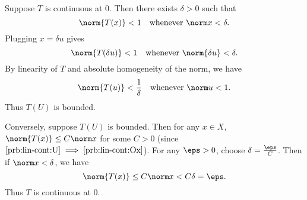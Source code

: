 \documentclass[12pt]{article}
\begin{document}
\begin{solution}
    Suppose $T$ is continuous at $0$.
    Then there exists $\delta > 0$ such that \[
        \norm{T(x)} < 1
            \quad\text{whenever } \norm x < \delta.
    \] Plugging $x = \delta u$ gives \[
        \norm{T(\delta u)} < 1
            \quad\text{whenever } \norm{\delta u} < \delta.
    \] By linearity of $T$ and absolute homogeneity of the norm, we have \[
        \norm{T(u)} < \frac1{\delta} \quad\text{whenever } \norm u < 1.
    \] Thus $T(U)$ is bounded.

    Conversely, suppose $T(U)$ is bounded.
    Then for any $x \in X$, $\norm{T(x)} \le C\norm x$ for some $C > 0$
    (since $\ref{prb:lin-cont:U} \implies \ref{prb:lin-cont:Ox}$).
    For any $\eps > 0$, choose $\delta = \frac{\eps}{C}$.
    Then if $\norm x < \delta$, we have \[
        \norm{T(x)} \le C\norm x < C\delta = \eps.
    \] Thus $T$ is continuous at $0$.
\end{solution}
\end{document}
